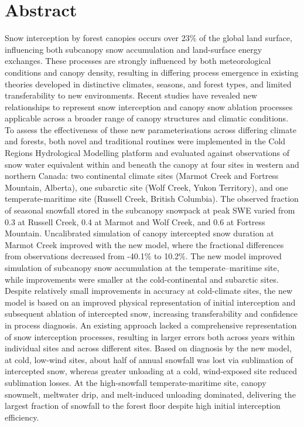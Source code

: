 \documentclass[
  letterpaper,
]{tex/uofsthesis-cs}
\begin{document}
\section{Abstract}\label{abstract-3}

Snow interception by forest canopies occurs over 23\% of the global land
surface, influencing both subcanopy snow accumulation and land-surface
energy exchanges. These processes are strongly influenced by both
meteorological conditions and canopy density, resulting in differing
process emergence in existing theories developed in distinctive
climates, seasons, and forest types, and limited transferability to new
environments. Recent studies have revealed new relationships to
represent snow interception and canopy snow ablation processes
applicable across a broader range of canopy structures and climatic
conditions. To assess the effectiveness of these new parameterisations
across differing climate and forests, both novel and traditional
routines were implemented in the Cold Regions Hydrological Modelling
platform and evaluated against observations of snow water equivalent
within and beneath the canopy at four sites in western and northern
Canada: two continental climate sites (Marmot Creek and Fortress
Mountain, Alberta), one subarctic site (Wolf Creek, Yukon Territory),
and one temperate-maritime site (Russell Creek, British Columbia). The
observed fraction of seasonal snowfall stored in the subcanopy snowpack
at peak SWE varied from 0.3 at Russell Creek, 0.4 at Marmot and Wolf
Creek, and 0.6 at Fortress Mountain. Uncalibrated simulation of canopy
intercepted snow duration at Marmot Creek improved with the new model,
where the fractional differences from observations decreased from
-40.1\% to 10.2\%. The new model improved simulation of subcanopy snow
accumulation at the temperate--maritime site, while improvements were
smaller at the cold-continental and subarctic sites. Despite relatively
small improvements in accuracy at cold-climate sites, the new model is
based on an improved physical representation of initial interception and
subsequent ablation of intercepted snow, increasing transferability and
confidence in process diagnosis. An existing approach lacked a
comprehensive representation of snow interception processes, resulting
in larger errors both across years within individual sites and across
different sites. Based on diagnosis by the new model, at cold, low-wind
sites, about half of annual snowfall was lost via sublimation of
intercepted snow, whereas greater unloading at a cold, wind-exposed site
reduced sublimation losses. At the high-snowfall temperate-maritime
site, canopy snowmelt, meltwater drip, and melt-induced unloading
dominated, delivering the largest fraction of snowfall to the forest
floor despite high initial interception efficiency.
\end{document}
